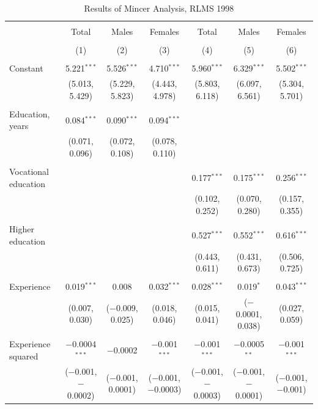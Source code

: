 \documentclass[alpha-refs]{wiley-article-01g}
\begin{document}
\begin{landscape}

\fontsize{9}{11}
\selectfont

\begin{table}[!htbp] \centering 
\renewcommand{\arraystretch}{1.0}
  \caption{Results of Mincer Analysis, RLMS 1998} 
  \label{} 
\begin{tabular}{@{\extracolsep{5pt}}lcccccc} 
\\[-1.8ex]\hline 
\hline \\[-1.8ex] 
 & Total & Males & Females & Total & Males & Females \\ 
\\[-1.8ex] & (1) & (2) & (3) & (4) & (5) & (6)\\ 
\hline \\[-1.8ex] 
 Constant & 5.221$^{***}$ & 5.526$^{***}$ & 4.710$^{***}$ & 5.960$^{***}$ & 6.329$^{***}$ & 5.502$^{***}$ \\ 
  & (5.013, 5.429) & (5.229, 5.823) & (4.443, 4.978) & (5.803, 6.118) & (6.097, 6.561) & (5.304, 5.701) \\ 
  & & & & & & \\ 
 Education, years & 0.084$^{***}$ & 0.090$^{***}$ & 0.094$^{***}$ &  &  &  \\ 
  & (0.071, 0.096) & (0.072, 0.108) & (0.078, 0.110) &  &  &  \\ 
  & & & & & & \\ 
 Vocational education &  &  &  & 0.177$^{***}$ & 0.175$^{***}$ & 0.256$^{***}$ \\ 
  &  &  &  & (0.102, 0.252) & (0.070, 0.280) & (0.157, 0.355) \\ 
  & & & & & & \\ 
 Higher education &  &  &  & 0.527$^{***}$ & 0.552$^{***}$ & 0.616$^{***}$ \\ 
  &  &  &  & (0.443, 0.611) & (0.431, 0.673) & (0.506, 0.725) \\ 
  & & & & & & \\ 
 Experience & 0.019$^{***}$ & 0.008 & 0.032$^{***}$ & 0.028$^{***}$ & 0.019$^{*}$ & 0.043$^{***}$ \\ 
  & (0.007, 0.030) & ($-$0.009, 0.025) & (0.018, 0.046) & (0.015, 0.041) & ($-$0.0001, 0.038) & (0.027, 0.059) \\ 
  & & & & & & \\ 
 Experience squared & $-$0.0004$^{***}$ & $-$0.0002 & $-$0.001$^{***}$ & $-$0.001$^{***}$ & $-$0.0005$^{**}$ & $-$0.001$^{***}$ \\ 
  & ($-$0.001, $-$0.0002) & ($-$0.001, 0.0001) & ($-$0.001, $-$0.0003) & ($-$0.001, $-$0.0003) & ($-$0.001, $-$0.0001) & ($-$0.001, $-$0.001) \\ 

\end{tabular}
\end{table}
\end{landscape}
\end{document}
